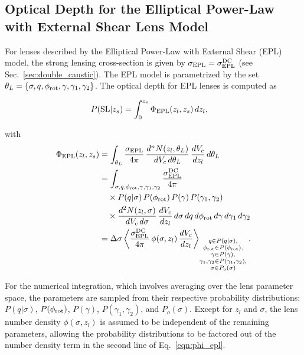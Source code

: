 \documentclass[aps,prd,twocolumn,superscriptaddress,groupedaddress,nofootinbib,showpacs,eqsecnum]{revtex4-1}
\begin{document}
\subsection{Optical Depth for the Elliptical Power-Law with External Shear Lens Model}\label{sec:sie_tau_2}

For lenses described by the Elliptical Power-Law with External Shear (EPL) model, the strong lensing cross-section is given by $\sigma_{\rm EPL}=\sigma^{\rm DC}_{\rm EPL}$ (see Sec.~\ref{sec:double_caustic}). The EPL model is parametrized by the set $\theta_L = \{\sigma, q, \phi_{\rm rot}, \gamma, \gamma_1, \gamma_2\}$. The optical depth for EPL lenses is computed as

\begin{align}
P({\rm SL}|z_s) &= \int_0^{z_s} \Phi_{\rm EPL}(z_l, z_s) \, dz_l,
\label{eqn:epl_1}
\end{align}

with
\begin{align}
\Phi_{\rm EPL}(z_l, z_s) &= \int_{\theta_L} \frac{\sigma_{\rm EPL}}{4\pi} \, \frac{d^nN(z_l, \theta_L)}{dV_c \, d\theta_L} \, \frac{dV_c}{dz_l} \, d\theta_L \\
&= \int_{\sigma,q,\phi_{\rm rot},\gamma,\gamma_1,\gamma_2} \frac{\sigma^{\rm DC}_{\rm EPL}}{4\pi}\notag \\
& \quad \times P(q|\sigma) \, P(\phi_{\rm rot}) \, P(\gamma) \, P(\gamma_1, \gamma_2)\notag \\
& \quad \times \frac{d^2N(z_l, \sigma)}{dV_c \, d\sigma} \, \frac{dV_c}{dz_l} \, d\sigma \, dq \, d\phi_{\rm rot} \, d\gamma \, d\gamma_1 \, d\gamma_2 \\
&= \Delta \sigma \left\langle 
\frac{\sigma^{\rm DC}_{\rm EPL}}{4\pi} \, \phi(\sigma, z_l) \, \frac{dV_c}{dz_l} 
\right\rangle_{\substack{
q \in P(q|\sigma), \\
\phi_{\rm rot} \in P(\phi_{\rm rot}), \\
\gamma \in P(\gamma), \\
\gamma_1, \gamma_2 \in P(\gamma_1, \gamma_2), \\
\sigma \in P_o(\sigma)
}}.
\label{eqn:phi_epl}
\end{align}

For the numerical integration, which involves averaging over the lens parameter space, the parameters are sampled from their respective probability distributions: $P(q|\sigma)$, $P(\phi_{\rm rot})$, $P(\gamma)$, $P(\gamma_1, \gamma_2)$, and $P_o(\sigma)$. Except for $z_l$ and $\sigma$, the lens number density $\phi(\sigma, z_l)$ is assumed to be independent of the remaining parameters, allowing the probability distributions to be factored out of the number density term in the second line of Eq.~\eqref{eqn:phi_epl}.
\end{document}
